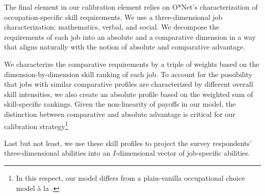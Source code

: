 \documentclass[onehalfspacing,11pt]{article}
\begin{document}
The final element in our calibration element relies on O*Net's characterization of occupation-specific skill requirements. We use a three-dimensional job characterization: mathematics, verbal, and social. We decompose the requirements of each job into an absolute and a comparative dimension in a way that aligns naturally with the notion of absolute and comparative advantage.

We characterize the comparative requirements by a triple of weights based on the dimension-by-dimension skill ranking of each job. To account for the possibility that jobs with similar comparative profiles are characterized by different overall skill intensities, we also create an absolute profile based on the weighted sum of skill-specific rankings. Given the non-linearity of payoffs in our model, the distinction between comparative and absolute advantage is critical for our calibration strategy\footnote{In this respect, our model differs from a plain-vanilla occupational choice model \`a la \cite{Roy:1951}.}

Last but not least, we use these skill profiles to project the survey respondents' three-dimensional abilities into an $I$-dimensional vector of job-specific abilities.



\end{document}
